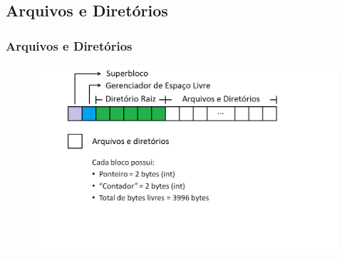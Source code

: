 \documentclass{beamer}
\begin{document}
\subsection{Arquivos e Diretórios}
\begin{frame}
\frametitle{Arquivos e Diretórios}
\begin{figure}
\centering
\includegraphics[scale=0.35]{arquivospng.png}
\end{figure}
\justifying
\end{frame}

\end{document}
